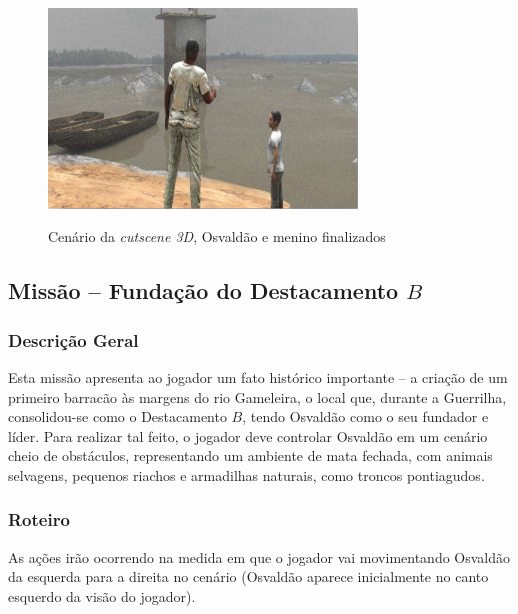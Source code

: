 \begin{figure}[H]
	\centering
	\caption{Cenário da \textit{cutscene 3D}, Osvaldão e menino finalizados}
	\includegraphics[width=0.73\textwidth]{figuras/osvaldo_final.png}
	\label{fig:forte-final}
	{}
\end{figure}

\subsection{Missão -- Fundação do Destacamento $B$}
\label{missao:funddestacB}

\subsubsection{Descrição Geral}

Esta missão apresenta ao jogador um fato histórico importante -- a criação de um primeiro barracão às margens do rio Gameleira, o local que, durante a Guerrilha, consolidou-se como o Destacamento $B$, tendo Osvaldão como o seu fundador e líder. Para realizar tal feito, o jogador deve controlar Osvaldão em um cenário cheio de obstáculos, representando um ambiente de mata fechada, com animais selvagens, pequenos riachos e armadilhas naturais, como troncos pontiagudos.

\subsubsection{Roteiro}

As ações irão ocorrendo na medida em que o jogador vai movimentando Osvaldão da esquerda para a direita no cenário (Osvaldão aparece inicialmente no canto esquerdo da visão do jogador).

